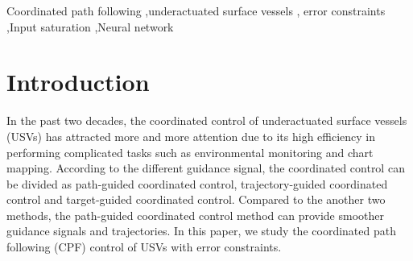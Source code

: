 \documentclass[a4paper,fleqn]{cas-dc}
\begin{document}
\begin{abstract}[S U M M A R Y]
In this paper, the coordinated path following control of multiple underactuated surface vessels with error constraints is studied. By combining tan-type barrier Lyapunov functions, this paper proposes a novel coordinated guidance law composed by desired surge speed and heading angle for each vehicle. By assigning the same number of parameterized paths to vehicles, the coordinated error variable is introduced by the graph theory, and then the desired update law for the each parameter of path is propsed to accomplish the coordination task. To track the desired guidance signal quickly and accuratly with high robustness, the radial neural-nerwork controller is developed for each vehicle by backstepping technique, in which, the neural network is used to estimate the unknown kinetic disturbances instantaneously. All closed-loop traking errors are proved to be uniform ultimately bounded by Lyapunov theory. In addition, the coordinated path following erros are bounded in the prescibed boundaries.
\end{abstract}
\begin{keywords}
	Coordinated path following \sep underactuated surface vessels \sep 
	error constraints \sep Input saturation \sep Neural network
\end{keywords}

\maketitle

\section{Introduction}
In the past two decades, the coordinated control of underactuated surface vessels (USVs) has attracted more and more attention due to its high efficiency in performing complicated tasks such as environmental monitoring and chart mapping. According to the different guidance signal, the coordinated control can be divided as path-guided coordinated control, trajectory-guided coordinated control and target-guided coordinated control. Compared to the another two methods, the path-guided coordinated control method can provide smoother guidance signals and trajectories. In this paper, we study the coordinated path following (CPF) control of USVs with error constraints.
\end{document}
